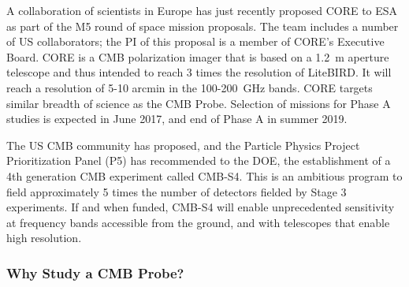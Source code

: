 
A collaboration of scientists in Europe has just recently proposed CORE to ESA as part of the M5 round 
of space mission proposals. 
The team includes a number of US collaborators; the PI of this proposal is a member of 
CORE's Executive Board. CORE is a CMB polarization imager that is based on a 
1.2~m aperture telescope and thus intended to reach 3 times the resolution of LiteBIRD. 
It will reach a resolution of 5-10 arcmin in the 100-200~GHz bands. CORE targets similar 
breadth of science as the CMB Probe. 
Selection of missions for Phase A studies is expected in June 2017, and end of Phase A in summer 2019.

The US CMB community has proposed, and the Particle Physics Project Prioritization Panel (P5) has recommended 
to the DOE, the establishment of a 4th generation CMB experiment called CMB-S4. This is an ambitious 
program to field approximately 5 times the number of detectors fielded by Stage 3 experiments. If and when funded, 
CMB-S4 will enable unprecedented sensitivity at frequency bands accessible from the ground, and 
with telescopes that enable high resolution. 


\vspace{-0.18in}

\subsubsection{Why Study a CMB Probe?} 

\vspace{-0.05in}


